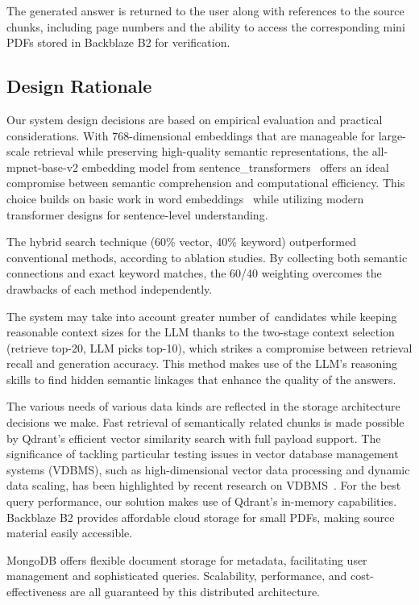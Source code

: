 \documentclass[runningheads]{llncs}
\begin{document}
The generated answer is returned to the user along with references to the source chunks, including page numbers and the ability to access the corresponding mini PDFs stored in Backblaze B2 for verification.

\subsection{Design Rationale}

Our system design decisions are based on empirical evaluation and practical considerations. With 768-dimensional embeddings that are manageable for large-scale retrieval while preserving high-quality semantic representations, the all-mpnet-base-v2 embedding model from sentence\_transformers~\cite{reimers2019sentence} offers an ideal compromise between semantic comprehension and computational efficiency. This choice builds on basic work in word embeddings~\cite{mikolov2013word2vec,pennington2014glove} while utilizing modern transformer designs for sentence-level understanding.

The hybrid search technique (60\% vector, 40\% keyword) outperformed conventional methods, according to ablation studies. By collecting both semantic connections and exact keyword matches, the 60/40 weighting overcomes the drawbacks of each method independently.

The system may take into account greater number of candidates while keeping reasonable context sizes for the LLM thanks to the two-stage context selection (retrieve top-20, LLM picks top-10), which strikes a compromise between retrieval recall and generation accuracy. This method makes use of the LLM's reasoning skills to find hidden semantic linkages that enhance the quality of the answers.

The various needs of various data kinds are reflected in the storage architecture decisions we make. Fast retrieval of semantically related chunks is made possible by Qdrant's efficient vector similarity search with full payload support. The significance of tackling particular testing issues in vector database management systems (VDBMS), such as high-dimensional vector data processing and dynamic data scaling, has been highlighted by recent research on VDBMS~\cite{wang2025vectordb}. For the best query performance, our solution makes use of Qdrant's in-memory capabilities. Backblaze B2 provides affordable cloud storage for small PDFs, making source material easily accessible.

MongoDB offers flexible document storage for metadata, facilitating user management and sophisticated queries. Scalability, performance, and cost-effectiveness are all guaranteed by this distributed architecture.
\end{document}
